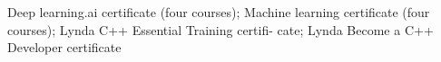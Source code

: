 \begin{cventries}
\cventry
    {}
    {}
    {}
    {}
    {
      \begin{cvitems}
        \item {Deep learning.ai certificate (four courses); Machine learning certificate (four courses); Lynda C++ Essential Training certifi-
        cate; Lynda Become a C++ Developer certificate
        }
      \end{cvitems}
    }
  
\end{cventries}
